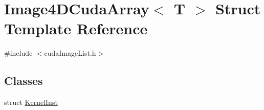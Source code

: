\hypertarget{struct_image4_d_cuda_array}{}\section{Image4\+D\+Cuda\+Array$<$ T $>$ Struct Template Reference}
\label{struct_image4_d_cuda_array}


{\ttfamily \#include $<$cuda\+Image\+List.\+h$>$}

\subsection*{Classes}
\begin{DoxyCompactItemize}
\item 
struct \hyperlink{struct_image4_d_cuda_array_1_1_kernel_inst}{Kernel\+Inst}
\end{DoxyCompactItemize}
